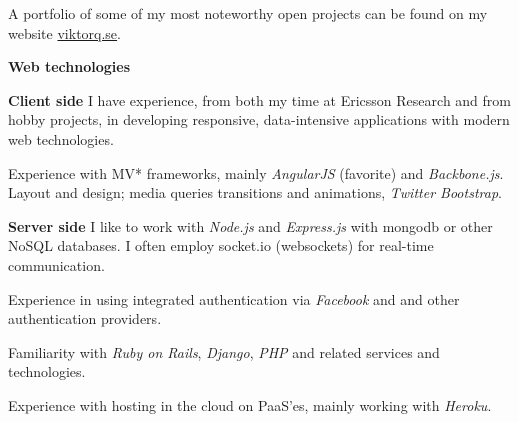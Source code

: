 \label{programming}

  A portfolio of some of my most noteworthy open projects can be found on my
  website \href{http://viktorq.se}{viktorq.se}.

\newenvironment{myitemize}{%
  \let\olditem\item
  \renewcommand\item[1][]{\olditem \textbf{##1}\hspace{0.35em}}
  \begin{list}{}{%
    \setlength{\leftmargin}{1.5em}
    \setlength{\itemsep}{0.25em}
    \setlength{\parskip}{0em}
    \setlength{\parsep}{0.25em}
  }
}{%
  \end{list}
}

\begin{myitemize}

  \item[Web technologies]
    \begin{list}{}{%
      \setlength{\leftmargin}{1.5em}
      \setlength{\itemsep}{0em}
      \setlength{\parskip}{0em}
      \setlength{\parsep}{0.25em}
    }
      \item[Client side]
        I have experience, from both my time at Ericsson Research and from hobby projects,
        in developing responsive, data-intensive applications
        with modern web technologies.

        Experience with MV* frameworks, mainly
        \emph{AngularJS} (favorite) and \emph{Backbone.js}. Layout and design; media queries
        transitions and animations, \emph{Twitter Bootstrap}.
      \item[Server side]
        I like to work with \emph{Node.js} and \emph{Express.js} with mongodb or other NoSQL databases.
        I often employ socket.io (websockets) for real-time communication.

        Experience in using integrated authentication via \emph{Facebook} and and other authentication
        providers.

        Familiarity with \emph{Ruby on Rails}, \emph{Django}, \emph{PHP} and related services
        and technologies.

        Experience with hosting in the cloud on PaaS'es, mainly working with \emph{Heroku}.
    \end{list}


\end{myitemize}

